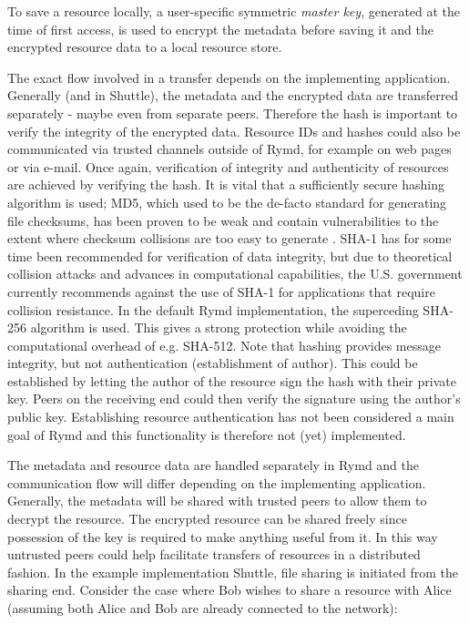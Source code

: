 To save a resource locally, a user-specific symmetric \emph{master key}, generated at the time of first access, is used to encrypt the metadata before saving it and the encrypted resource data to a local resource store.

The exact flow involved in a transfer depends on the implementing application. Generally (and in Shuttle), the metadata and the encrypted data are transferred separately - maybe even from separate peers. Therefore the hash is important to verify the integrity of the encrypted data. Resource IDs and hashes could also be communicated via trusted channels outside of Rymd, for example on web pages or via e-mail. Once again, verification of integrity and authenticity of resources are achieved by verifying the hash. It is vital that a sufficiently secure hashing algorithm is used; MD5, which used to be the de-facto standard for generating file checksums, has been proven to be weak and contain vulnerabilities to the extent where checksum collisions are too easy to generate \cite{MD5Broken:Online}. SHA-1 has for some time been recommended for verification of data integrity, but due to theoretical collision attacks and advances in computational capabilities, the U.S. government currently recommends against the use of SHA-1 for applications that require collision resistance\cite{NIST:2012}. In the default Rymd implementation, the superceding SHA-256 algorithm is used. This gives a strong protection while avoiding the computational overhead of e.g. SHA-512. Note that hashing provides message integrity, but not authentication (establishment of author). This could be established by letting the author of the resource sign the hash with their private key. Peers on the receiving end could then verify the signature using the author's public key. Establishing resource authentication has not been considered a main goal of Rymd and this functionality is therefore not (yet) implemented.

The metadata and resource data are handled separately in Rymd and the communication flow will differ depending on the implementing application. Generally, the metadata will be shared with trusted peers to allow them to decrypt the resource. The encrypted resource can be shared freely since possession of the key is required to make anything useful from it. In this way untrusted peers could help facilitate transfers of resources in a distributed fashion. In the example implementation Shuttle, file sharing is initiated from the sharing end. Consider the case where Bob wishes to share a resource with Alice (assuming both Alice and Bob are already connected to the network):

